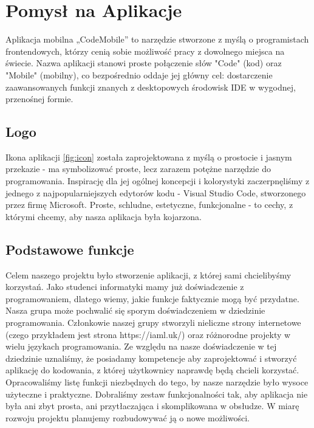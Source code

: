 \chapter{Pomysł na Aplikacje}

Aplikacja mobilna „CodeMobile” to narzędzie stworzone z myślą o programistach frontendowych, którzy cenią sobie możliwość pracy z dowolnego miejsca na świecie. Nazwa aplikacji stanowi proste połączenie słów "Code" (kod) oraz "Mobile" (mobilny), co bezpośrednio oddaje jej główny cel: dostarczenie zaawansowanych funkcji znanych z desktopowych środowisk IDE w wygodnej, przenośnej formie.
\section{Logo}
Ikona aplikacji \ref{fig:icon} została zaprojektowana z myślą o prostocie i jasnym przekazie - ma symbolizować proste, lecz zarazem potężne narzędzie do programowania. Inspirację dla jej ogólnej koncepcji i kolorystyki zaczerpnęliśmy z jednego z najpopularniejszych edytorów kodu - Visual Studio Code, stworzonego przez firmę Microsoft. Proste, schludne, estetyczne, funkcjonalne - to cechy, z którymi chcemy, aby nasza aplikacja była kojarzona.
\section{Podstawowe funkcje}
Celem naszego projektu było stworzenie aplikacji, z której sami chcielibyśmy korzystań. Jako studenci informatyki mamy już doświadczenie z programowaniem, dlatego wiemy, jakie funkcje faktycznie mogą być przydatne.
\newline\newline
Nasza grupa może pochwalić się sporym doświadczeniem w dziedzinie programowania. Członkowie naszej grupy stworzyli nieliczne strony internetowe (czego przykładem jest strona https://iaml.uk/) oraz różnorodne projekty w wielu językach programowania.
\newline\newline
Ze względu na nasze doświadczenie w tej dziedzinie uznaliśmy, że posiadamy kompetencje aby zaprojektować i stworzyć aplikację do kodowania, z której użytkownicy naprawdę będą chcieli korzystać. Opracowaliśmy listę funkcji niezbędnych do tego, by nasze narzędzie było wysoce użyteczne i praktyczne. Dobraliśmy zestaw funkcjonalności tak, aby aplikacja nie była ani zbyt prosta, ani przytłaczająca i skomplikowana w obsłudze. W miarę rozwoju projektu planujemy rozbudowywać ją o nowe możliwości.
